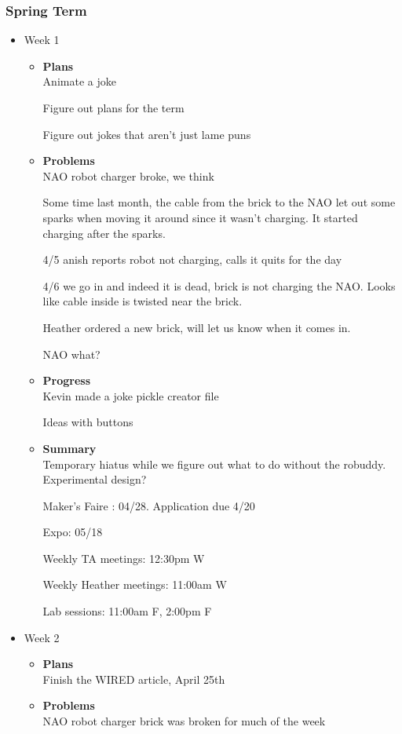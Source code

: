 	\subsubsection{Spring Term}
	\begin{itemize}
		\item{Week 1}
		\begin{itemize}
			\item \textbf{Plans} \\
			Animate a joke

Figure out plans for the term

Figure out jokes that aren't just lame puns

			\item \textbf{Problems} \\
			NAO robot charger broke, we think

Some time last month, the cable from the brick to the NAO let out some sparks when moving it around since it wasn't charging. It started charging after the sparks.

4/5 anish reports robot not charging, calls it quits for the day

4/6 we go in and indeed it is dead, brick is not charging the NAO. Looks like cable inside is twisted near the brick.

Heather ordered a new brick, will let us know when it comes in.

NAO what?
			\item \textbf{Progress} \\
			Kevin made a joke pickle creator file

Ideas with buttons


			\item \textbf{Summary} \\
			Temporary hiatus while we figure out what to do without the robuddy. Experimental design?

Maker's Faire : 04/28. Application due 4/20

Expo: 05/18

Weekly TA meetings: 12:30pm W

Weekly Heather meetings: 11:00am W

Lab sessions: 11:00am F, 2:00pm F
		\end{itemize}
		\item{Week 2}
		\begin{itemize}
			\item \textbf{Plans} \\
			Finish the WIRED article, April 25th
			\item \textbf{Problems} \\
			NAO robot charger brick was broken for much of the week


\end{itemize}
\end{itemize}
